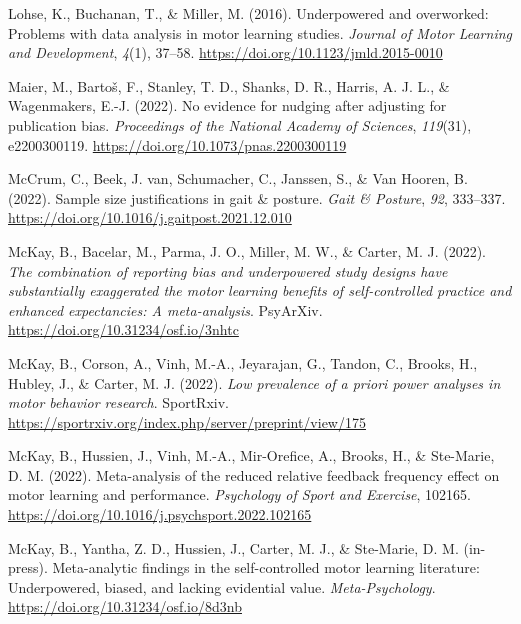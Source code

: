 \documentclass[
  man, donotrepeattitle,mask,floatsintext]{apa7}
\newlength{\cslhangindent}
\newlength{\cslentryspacingunit} %
\newenvironment{CSLReferences}[2] %
 {%
  \setlength{\parindent}{0pt}
  \ifodd #1
  \let\oldpar\par
  \def\par{\hangindent=\cslhangindent\oldpar}
  \fi
  \setlength{\parskip}{#2\cslentryspacingunit}
 }%
 {}
\begin{document}
\begin{CSLReferences}{1}{0}
\leavevmode{}%
Lohse, K., Buchanan, T., \& Miller, M. (2016). Underpowered and overworked: Problems with data analysis in motor learning studies. \emph{Journal of Motor Learning and Development}, \emph{4}(1), 37--58. \url{https://doi.org/10.1123/jmld.2015-0010}

\leavevmode{}%
Maier, M., Bartoš, F., Stanley, T. D., Shanks, D. R., Harris, A. J. L., \& Wagenmakers, E.-J. (2022). No evidence for nudging after adjusting for publication bias. \emph{Proceedings of the National Academy of Sciences}, \emph{119}(31), e2200300119. \url{https://doi.org/10.1073/pnas.2200300119}

\leavevmode{}%
McCrum, C., Beek, J. van, Schumacher, C., Janssen, S., \& Van Hooren, B. (2022). Sample size justifications in gait \& posture. \emph{Gait \& Posture}, \emph{92}, 333--337. \url{https://doi.org/10.1016/j.gaitpost.2021.12.010}

\leavevmode{}%
McKay, B., Bacelar, M., Parma, J. O., Miller, M. W., \& Carter, M. J. (2022). \emph{The combination of reporting bias and underpowered study designs have substantially exaggerated the motor learning benefits of self-controlled practice and enhanced expectancies: A meta-analysis}. PsyArXiv. \url{https://doi.org/10.31234/osf.io/3nhtc}

\leavevmode{}%
McKay, B., Corson, A., Vinh, M.-A., Jeyarajan, G., Tandon, C., Brooks, H., Hubley, J., \& Carter, M. J. (2022). \emph{Low prevalence of a priori power analyses in motor behavior research}. SportRxiv. \url{https://sportrxiv.org/index.php/server/preprint/view/175}

\leavevmode{}%
McKay, B., Hussien, J., Vinh, M.-A., Mir-Orefice, A., Brooks, H., \& Ste-Marie, D. M. (2022). Meta-analysis of the reduced relative feedback frequency effect on motor learning and performance. \emph{Psychology of Sport and Exercise}, 102165. \url{https://doi.org/10.1016/j.psychsport.2022.102165}

\leavevmode{}%
McKay, B., Yantha, Z. D., Hussien, J., Carter, M. J., \& Ste-Marie, D. M. (in-press). Meta-analytic findings in the self-controlled motor learning literature: Underpowered, biased, and lacking evidential value. \emph{Meta-Psychology}. \url{https://doi.org/10.31234/osf.io/8d3nb}


\end{CSLReferences}
\end{document}
